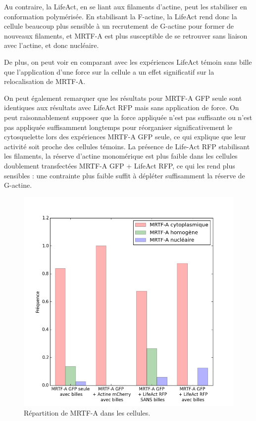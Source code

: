 \documentclass{report}
\begin{document}
Au contraire, la LifeAct, en se liant aux filaments d'actine, peut les stabiliser en conformation polymérisée. En stabilisant la F-actine, la LifeAct rend donc la cellule beaucoup plus sensible à un recrutement de G-actine pour former de nouveaux filaments, et MRTF-A est plus susceptible de se retrouver sans liaison avec l'actine, et donc nucléaire.

De plus, on peut voir en comparant avec les expériences LifeAct témoin sans bille que l'application d'une force sur la cellule a un effet significatif sur la relocalisation de MRTF-A. 

On peut également remarquer que les résultats pour MRTF-A GFP seule sont identiques aux résultats avec LifeAct RFP mais sans application de force. 
On peut raisonnablement supposer que la force appliquée n'est pas suffisante ou n'est pas appliquée suffisamment longtemps pour réorganiser significativement le cytosquelette lors des expériences MRTF-A GFP seule, ce qui explique que leur activité soit proche des cellules témoins. 
La présence de Life-Act RFP stabilisant les filaments, la réserve d'actine monomérique est plus faible dans les cellules doublement transfectées MRTF-A GFP + LifeAct RFP, ce qui les rend plus sensibles : une contrainte plus faible suffit à dépléter suffisamment la réserve de G-actine. 

\begin{figure}
\includegraphics[scale=0.4]{Figures/CHN_pinces.png} 
\caption{Répartition de MRTF-A dans les cellules. \label{CHN_pinces}}
\end{figure}
\end{document}
